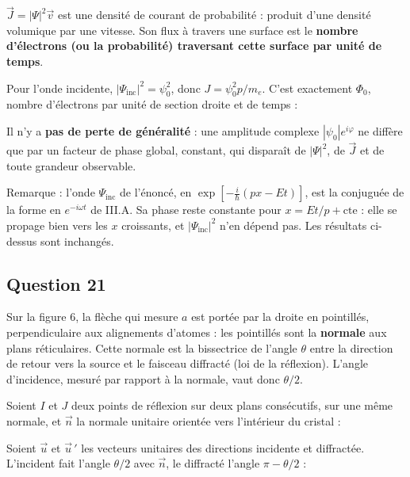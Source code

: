 \documentclass[11pt,a4paper]{article}
\newcommand{\equationajustee}[1]{%
  \sbox{\boiteequation}{$\displaystyle #1$}%
  \ifdim\wd\boiteequation>\linewidth
    \[\resizebox{\linewidth}{!}{\usebox{\boiteequation}}\]%
  \else
    \[#1\]%
  \fi}
\begin{document}
\equationajustee{\boxed{[\vec J]=L^{-2}\,T^{-1}}}

\(\vec J=|\Psi|^2\vec v\) est une densité de courant de probabilité : produit d'une densité volumique par une vitesse. Son flux à travers une surface est le \textbf{nombre d'électrons (ou la probabilité) traversant cette surface par unité de temps}.

Pour l'onde incidente, \(|\Psi_{\text{inc}}|^2=\psi_0^2\), donc \(J=\psi_0^2p/m_e\). C'est exactement \(\Phi_0\), nombre d'électrons par unité de section droite et de temps :

\equationajustee{\boxed{\psi_0=\sqrt{\frac{m_e\,\Phi_0}{p}}}}

Il n'y a \textbf{pas de perte de généralité} : une amplitude complexe \(|\psi_0|e^{i\varphi}\) ne diffère que par un facteur de phase global, constant, qui disparaît de \(|\Psi|^2\), de \(\vec J\) et de toute grandeur observable.

Remarque : l'onde \(\Psi_{\text{inc}}\) de l'énoncé, en \(\exp\left[-\frac{i}{\hbar}(px-Et)\right]\), est la conjuguée de la forme en \(e^{-i\omega t}\) de III.A. Sa phase reste constante pour \(x=Et/p+\text{cte}\) : elle se propage bien vers les \(x\) croissants, et \(|\Psi_{\text{inc}}|^2\) n'en dépend pas. Les résultats ci-dessus sont inchangés.

\hypertarget{question-21}{%
\subsection{Question 21}\label{question-21}}

Sur la figure 6, la flèche qui mesure \(a\) est portée par la droite en pointillés, perpendiculaire aux alignements d'atomes : les pointillés sont la \textbf{normale} aux plans réticulaires. Cette normale est la bissectrice de l'angle \(\theta\) entre la direction de retour vers la source et le faisceau diffracté (loi de la réflexion). L'angle d'incidence, mesuré par rapport à la normale, vaut donc \(\theta/2\).

Soient \(I\) et \(J\) deux points de réflexion sur deux plans consécutifs, sur une même normale, et \(\vec n\) la normale unitaire orientée vers l'intérieur du cristal :

\equationajustee{\vec{IJ}=a\,\vec n.}

Soient \(\vec u\) et \(\vec u\,'\) les vecteurs unitaires des directions incidente et diffractée. L'incident fait l'angle \(\theta/2\) avec \(\vec n\), le diffracté l'angle \(\pi-\theta/2\) :
\end{document}

